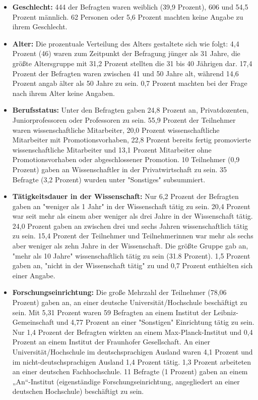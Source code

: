 \begin{itemize}
\item \textbf{Geschlecht:} 444 der Befragten waren weiblich (39,9 Prozent), 606 und 54,5 Prozent männlich. 62 Personen oder 5,6 Prozent machten keine Angabe zu ihrem Geschlecht.
\item \textbf{Alter:} Die prozentuale Verteilung des Alters gestaltete sich wie folgt: 4,4 Prozent (46) waren zum Zeitpunkt der Befragung jünger als 31 Jahre, die größte Altersgruppe mit 31,2 Prozent stellten die 31 bis 40 Jährigen dar. 17,4 Prozent der Befragten waren zwischen 41 und 50 Jahre alt, während 14,6 Prozent angab älter als 50 Jahre zu sein. 0,7 Prozent machten bei der Frage nach ihrem Alter keine Angaben.
\item \textbf{Berufsstatus:} Unter den Befragten gaben 24,8 Prozent an, Privatdozenten, Juniorprofessoren oder Professoren zu sein. 55,9 Prozent der Teilnehmer waren wissenschaftliche Mitarbeiter, 20,0 Prozent wissenschaftliche Mitarbeiter mit Promotionsvorhaben, 22,8 Prozent bereits fertig promovierte wissenschaftliche Mitarbeiter und 13,1 Prozent Mitarbeiter ohne Promotionsvorhaben oder abgeschlossener Promotion. 10 Teilnehmer (0,9 Prozent) gaben an Wissenschaftler in der Privatwirtschaft zu sein. 35 Befragte (3,2 Prozent) wurden unter "Sonstiges" subsummiert.
\item \textbf{Tätigkeitsdauer in der Wissenschaft:} Nur 6,2 Prozent der Befragten gaben an "weniger als 1 Jahr" in der Wissenschaft tätig zu sein. 20,4 Prozent war seit mehr als einem aber weniger als drei Jahre in der Wissenschaft tätig. 24,0 Prozent gaben an zwischen drei und sechs Jahren wissenschaftlich tätig zu sein. 15,4 Prozent der Teilnehmer und Teilnehmerinnen war mehr als sechs aber weniger als zehn Jahre in der Wissenschaft. Die größte Gruppe gab an, "mehr als 10 Jahre" wissenschaftlich tätig zu sein (31.8 Prozent). 1,5 Prozent gaben an, "nicht in der Wissenschaft tätig" zu und 0,7 Prozent enthielten sich einer Angabe.
\item \textbf{Forschungseinrichtung:} Die große Mehrzahl der Teilnehmer (78,06 Prozent) gaben an, an einer deutsche Universität/Hochschule beschäftigt zu sein. Mit 5,31 Prozent waren 59 Befragten an einem Institut der Leibniz-Gemeinschaft und 4,77 Prozent an einer "Sonstigen" Einrichtung tätig zu sein. Nur 1,4 Prozent der Befragten wirkten an einem Max-Planck-Institut und 0,4 Prozent an einem Institut der Fraunhofer Gesellschaft. An einer Universität/Hochschule im deutschsprachigen Ausland waren 4,1 Prozent und im nicht-deutschsprachigen Ausland 1,4 Prozent tätig. 1,3 Prozent arbeiteten an einer deutschen Fachhochschule. 11 Befragte (1 Prozent) gaben an einem „An“-Institut (eigenständige Forschungseinrichtung, angegliedert an einer deutschen Hochschule) beschäftigt zu sein.
\end{itemize}

